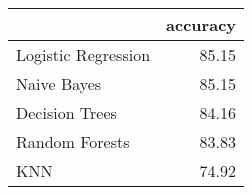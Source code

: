 \begin{tabular}{lr}
\toprule
{} &  accuracy \\
\midrule
Logistic Regression &     85.15 \\
Naive Bayes         &     85.15 \\
Decision Trees      &     84.16 \\
Random Forests      &     83.83 \\
KNN                 &     74.92 \\
\bottomrule
\end{tabular}

